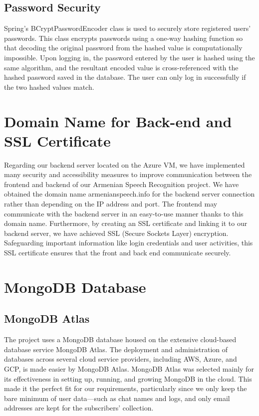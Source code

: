 \documentclass[conference]{IEEEtran}
\begin{document}
\subsection{Password Security}

Spring's BCryptPasswordEncoder class is used to securely store registered users' passwords. This class encrypts passwords using a one-way hashing function so that decoding the original password from the hashed value is computationally impossible. Upon logging in, the password entered by the user is hashed using the same algorithm, and the resultant encoded value is cross-referenced with the hashed password saved in the database. The user can only log in successfully if the two hashed values match.

\section{Domain Name for Back-end and SSL Certificate}

Regarding our backend server located on the Azure VM, we have implemented many security and accessibility measures to improve communication between the frontend and backend of our Armenian Speech Recognition project. We have obtained the domain name armenianspeech.info for the backend server connection rather than depending on the IP address and port. The frontend may communicate with the backend server in an easy-to-use manner thanks to this domain name. Furthermore, by creating an SSL certificate and linking it to our backend server, we have achieved SSL (Secure Sockets Layer) encryption. Safeguarding important information like login credentials and user activities, this SSL certificate ensures that the front and back end communicate securely. 

\section{MongoDB Database}

\subsection{MongoDB Atlas}

The project uses a MongoDB database housed on the extensive cloud-based database service MongoDB Atlas. The deployment and administration of databases across several cloud service providers, including AWS, Azure, and GCP, is made easier by MongoDB Atlas. MongoDB Atlas was selected mainly for its effectiveness in setting up, running, and growing MongoDB in the cloud. This made it the perfect fit for our requirements, particularly since we only keep the bare minimum of user data—such as chat names and logs, and only email addresses are kept for the subscribers' collection.
\end{document}
